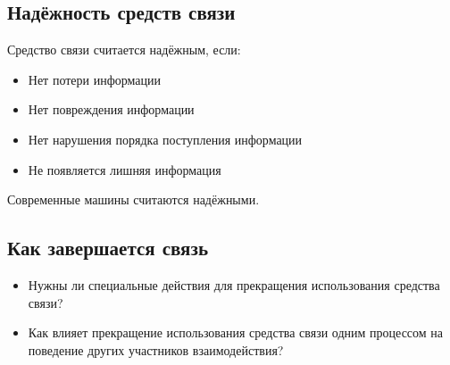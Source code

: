 \documentclass[12pt, a4paper]{article}
\begin{document}
    \subsection*{Надёжность средств связи}
    \begin{center}
        Средство связи считается надёжным, если:
    \end{center}
    \begin{itemize}
        \item Нет потери информации
        \item Нет повреждения информации
        \item Нет нарушения порядка поступления информации
        \item Не появляется лишняя информация
    \end{itemize}
    Современные машины считаются надёжными.
    \subsection*{Как завершается связь}
    \begin{itemize}
        \item Нужны ли специальные действия для прекращения использования средства связи?
        \item Как влияет прекращение использования средства связи одним процессом на поведение других участников взаимодействия?
    \end{itemize}
\end{document}
